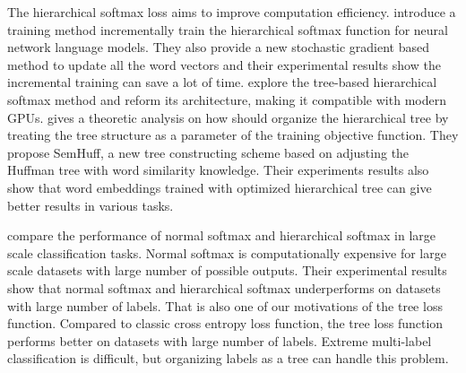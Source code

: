 \documentclass[twoside]{article}
\theoremstyle{definition}
\begin{document}
The hierarchical softmax loss aims to improve computation efficiency. 
\cite{Peng2017IncrementallyLT} introduce a training method incrementally train the hierarchical softmax function for neural network language models.
They also provide a new stochastic gradient based method to update all the word vectors and their experimental results show the incremental training can save a lot of time.
\cite{Jiang2017ExplorationOT} explore the tree-based hierarchical softmax method and reform its architecture, making it compatible with modern GPUs.
\cite{Yang2017OptimizeHS} gives a theoretic analysis on how should organize the hierarchical tree by treating the tree structure as a parameter of the training objective function.
They propose SemHuff, a new tree constructing scheme based on adjusting the Huffman tree with word similarity knowledge.
Their experiments results also show that word embeddings trained with optimized hierarchical tree can give better results in various tasks.

\cite{Mohammed2018EffectivenessOH} compare the performance of normal softmax and hierarchical softmax in large scale classification tasks. 
Normal softmax is computationally expensive for large scale datasets with large number of possible outputs.
Their experimental results show that normal softmax and hierarchical softmax underperforms on datasets with large number of labels.
That is also one of our motivations of the tree loss function. 
Compared to classic cross entropy loss function, the tree loss function performs better on datasets with large number of labels.
Extreme multi-label classification is difficult, but organizing labels as a tree can handle this problem. 




\end{document}
